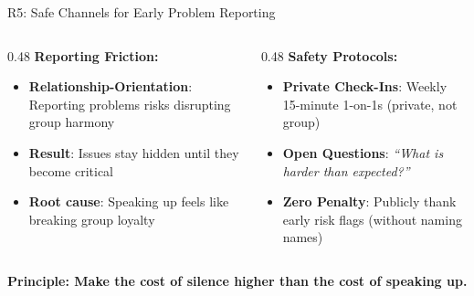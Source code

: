 \documentclass[aspectratio=169, 12pt]{beamer}
\newcommand{\presenter}[1]{\gdef\currentpresenter{#1}}
\gdef\currentpresenter{}
\begin{document}
\begin{frame}{R5: Safe Channels for Early Problem Reporting}
\presenter{Presenter: Hemanth Kumar KOKUTAM}

\vspace{0.3em}

\begin{columns}[T]
\begin{column}{0.48\textwidth}
\textbf{Reporting Friction:}
\begin{itemize}
    \item \textbf{Relationship-Orientation}: Reporting problems risks disrupting group harmony
    \item \textbf{Result}: Issues stay hidden until they become critical
    \item \textbf{Root cause}: Speaking up feels like breaking group loyalty
\end{itemize}
\end{column}

\begin{column}{0.48\textwidth}
\textbf{Safety Protocols:}
\begin{itemize}
    \item \textbf{Private Check-Ins}: Weekly 15-minute 1-on-1s (private, not group)
    \item \textbf{Open Questions}: \textit{``What is harder than expected?''}
    \item \textbf{Zero Penalty}: Publicly thank early risk flags (without naming names)
\end{itemize}
\end{column}
\end{columns}

\vspace{0.5em}
\begin{center}
\alert{\textbf{Principle: Make the cost of silence higher than the cost of speaking up.}}
\end{center}

\end{frame}

\end{document}
